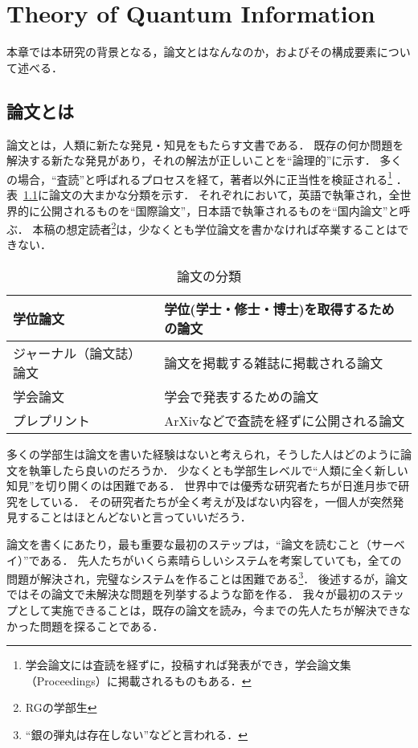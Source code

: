 \chapter{Theory of Quantum Information}
\label{theory_of_quantum_information}

本章では本研究の背景となる，論文とはなんなのか，およびその構成要素について述べる．

\section{論文とは}
\label{background:whtthesis}
論文とは，人類に新たな発見・知見をもたらす文書である．
既存の何か問題を解決する新たな発見があり，それの解法が正しいことを``論理的''に示す．
多くの場合，``査読''と呼ばれるプロセスを経て，著者以外に正当性を検証される\footnote{学会論文には査読を経ずに，投稿すれば発表ができ，学会論文集（Proceedings）に掲載されるものもある．} ．
表~\ref{table:typepaper}に論文の大まかな分類を示す．
それぞれにおいて，英語で執筆され，全世界的に公開されるものを``国際論文''，日本語で執筆されるものを``国内論文''と呼ぶ．
本稿の想定読者\footnote{RGの学部生}は，少なくとも学位論文を書かなければ卒業することはできない．

\begin{table}[!hbtp]
    \begin{center}
        \caption{論文の分類}
				\label{table:typepaper}
  			\begin{tabular}{|l|l|}
					\hline
    			学位論文 & 学位(学士・修士・博士)を取得するための論文 \\
					\hline
    			ジャーナル（論文誌）論文 & 論文を掲載する雑誌に掲載される論文  \\
    			\hline
					学会論文 & 学会で発表するための論文 \\
    			\hline \hline
					プレプリント & ArXivなどで査読を経ずに公開される論文  \\
  				\hline
				\end{tabular}
		\end{center}
\end{table}

多くの学部生は論文を書いた経験はないと考えられ，そうした人はどのように論文を執筆したら良いのだろうか．
少なくとも学部生レベルで``人類に全く新しい知見''を切り開くのは困難である．
世界中では優秀な研究者たちが日進月歩で研究をしている．
その研究者たちが全く考えが及ばない内容を，一個人が突然発見することはほとんどないと言っていいだろう．

論文を書くにあたり，最も重要な最初のステップは，``論文を読むこと（サーベイ）''である．
先人たちがいくら素晴らしいシステムを考案していても，全ての問題が解決され，完璧なシステムを作ることは困難である\footnote{``銀の弾丸は存在しない''などと言われる．}．
後述するが，論文ではその論文で未解決な問題を列挙するような節を作る．
我々が最初のステップとして実施できることは，既存の論文を読み，今までの先人たちが解決できなかった問題を探ることである．


